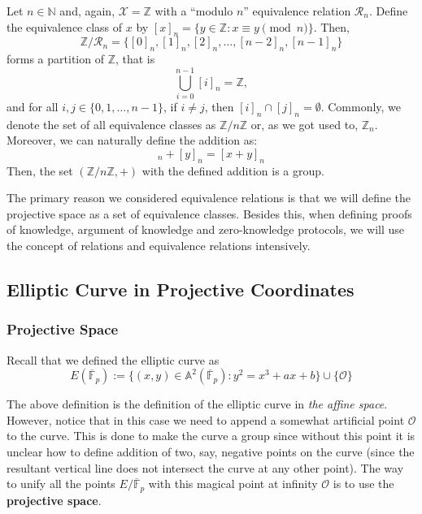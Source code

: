 \documentclass[../lecture-notes.tex]{subfiles}
\begin{document}
\begin{example}
    Let $n \in \mathbb{N}$ and, again, $\mathcal{X} = \mathbb{Z}$ with a ``modulo $n$'' equivalence relation $\mathcal{R}_n$. Define the equivalence class of $x$ by $[x]_n = \{y \in \mathbb{Z}: x \equiv y \pmod{n}\}$. Then, 
    \begin{equation}
        \mathbb{Z}/\mathcal{R}_n = \{[0]_n, [1]_n, [2]_n, \dots, [n-2]_n, [n-1]_n\}
    \end{equation}
    forms a partition of $\mathbb{Z}$, that is 
    \begin{equation}
        \bigcup_{i=0}^{n-1} [i]_n = \mathbb{Z},
    \end{equation}
    and for all $i,j \in \{0,1,\dots,n-1\}$, if $i \neq j$, then $[i]_n \cap [j]_n = \emptyset$. Commonly, we denote the set of all equivalence classes as $\mathbb{Z}/n\mathbb{Z}$ or, as we got used to, $\mathbb{Z}_n$. Moreover, we can naturally define the addition as:
    \begin{equation}
        [x]_n + [y]_n = [x+y]_n
    \end{equation}
    Then, the set $(\mathbb{Z}/n\mathbb{Z},+)$ with the defined addition is a group.
\end{example}

The primary reason we considered equivalence relations is that we will define the projective space as a set of equivalence classes. Besides this, when defining proofs of knowledge, argument of knowledge and zero-knowledge protocols, we will use the concept of relations and equivalence relations intensively.

\subsection{Elliptic Curve in Projective Coordinates}
\subsubsection{Projective Space}

Recall that we defined the elliptic curve as 
\begin{equation}    
    E(\overline{\mathbb{F}}_p) := \{(x,y) \in \mathbb{A}^2(\overline{\mathbb{F}}_p): y^2 = x^3+ax+b\} \cup \{\mathcal{O}\}
\end{equation}

The above definition is the definition of the elliptic curve in \textit{the affine space}. However, notice that in this case 
we need to append a somewhat artificial point $\mathcal{O}$ to the curve. This is done to make the curve a group since without 
this point it is unclear how to define addition of two, say, negative points on the curve (since the resultant vertical line
does not intersect the curve at any other point). The way to unify all the points $E/\overline{\mathbb{F}}_p$ with this 
magical point at infinity $\mathcal{O}$ is to use the \textbf{projective space}.
\end{document}
